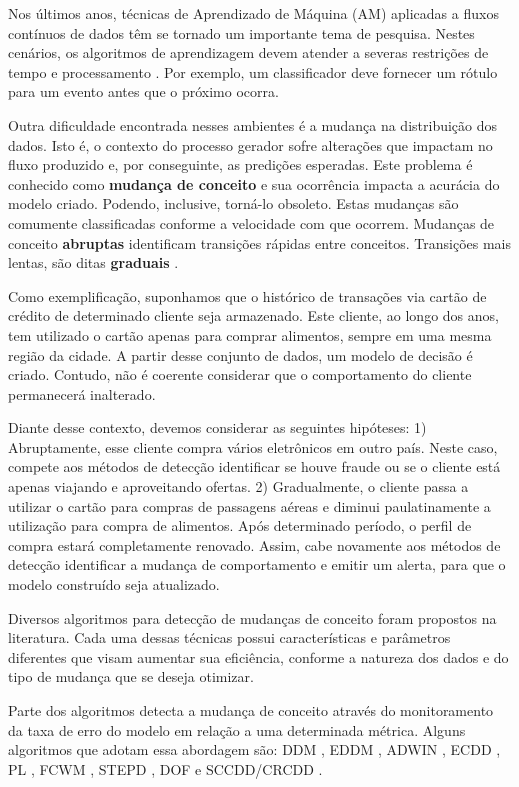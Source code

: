 \documentclass[qual, classic, a4paper]{ufbathesis}
\begin{document}
Nos últimos anos, técnicas de Aprendizado de Máquina (AM) aplicadas a fluxos contínuos de dados têm se tornado um importante tema de pesquisa.
Nestes cenários, os algoritmos de aprendizagem devem atender a severas restrições de tempo e processamento \cite{Bifet:2009:ALM:1656274.1656287}.
Por exemplo, um classificador deve fornecer um rótulo para um evento antes que o próximo ocorra. 

Outra dificuldade encontrada nesses ambientes é a mudança na distribuição dos dados. 
Isto é, o contexto do processo gerador sofre alterações que impactam no fluxo produzido e, por conseguinte, as predições esperadas.
Este problema é conhecido como \textbf{mudança de conceito} \cite{Gama:2010:KDD:1855075} e sua ocorrência impacta a acurácia do modelo criado.
Podendo, inclusive, torná-lo obsoleto.
Estas mudanças são comumente classificadas conforme a velocidade com que ocorrem.
Mudanças de conceito \textbf{abruptas} identificam transições rápidas entre conceitos. 
Transições mais lentas, são ditas \textbf{graduais} \cite{Gama:2014:SCD:2597757.2523813}.

Como exemplificação, suponhamos que o histórico de transações via cartão de crédito de determinado cliente seja armazenado.
Este cliente, ao longo dos anos, tem utilizado o cartão apenas para comprar alimentos, sempre em uma mesma região da cidade.
A partir desse conjunto de dados, um modelo de decisão é criado.
Contudo, não é coerente considerar que o comportamento do cliente permanecerá inalterado.

Diante desse contexto, devemos considerar as seguintes hipóteses:
1) Abruptamente, esse cliente compra vários eletrônicos em outro país.
Neste caso, compete aos métodos de detecção identificar se houve fraude ou se o cliente está apenas viajando e aproveitando ofertas.
2) Gradualmente, o cliente passa a utilizar o cartão para compras de passagens aéreas e diminui paulatinamente a utilização para compra de alimentos.
Após determinado período, o perfil de compra estará completamente renovado.
Assim, cabe novamente aos métodos de detecção identificar a mudança de comportamento e emitir um alerta, 
para que o modelo construído seja atualizado.

Diversos algoritmos para detecção de mudanças de conceito foram propostos na literatura.
Cada uma dessas técnicas possui características e parâmetros diferentes que visam aumentar sua eficiência, 
conforme a natureza dos dados e do tipo de mudança que se deseja otimizar.

Parte dos algoritmos detecta a mudança de conceito através do monitoramento da taxa de erro do modelo em relação a uma determinada métrica.
Alguns algoritmos que adotam essa abordagem são: 
DDM \cite{GamaMCR04}, EDDM \cite{EDDM},  
ADWIN \cite{BifetG07}, ECDD \cite{Ross:2012:EWM:2076039.2076307}, 
PL \cite{Bach:PL:2008}, FCWM \cite{FCWM}, STEPD \cite{STEPD}, DOF \cite{Sobhani:2011:NDD:2045295.2045309} e 
SCCDD/CRCDD \cite{daCosta:2016:UDS:2956219.2956389}.
\end{document}
